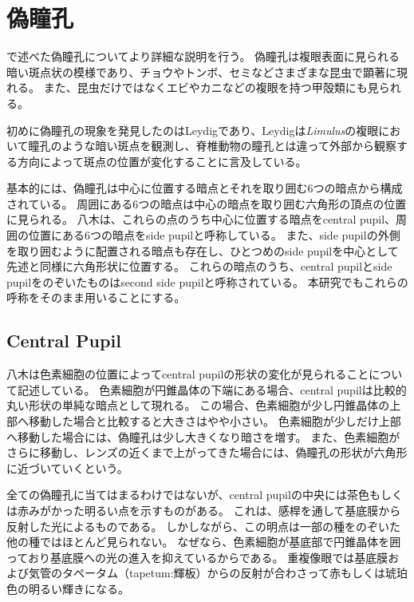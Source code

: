 \section{偽瞳孔}
\label{SPseudopupil}

で述べた偽瞳孔についてより詳細な説明を行う。
偽瞳孔は複眼表面に見られる暗い斑点状の模様であり、チョウやトンボ、セミなどさまざまな昆虫で顕著に現れる。
また、昆虫だけではなくエビやカニなどの複眼を持つ甲殻類にも見られる。


初めに偽瞳孔の現象を発見したのはLeydig\cite{}であり、Leydigは{\it Limulus}の複眼において瞳孔のような暗い斑点を観測し、脊椎動物の瞳孔とは違って外部から観察する方向によって斑点の位置が変化することに言及している。

基本的には、偽瞳孔は中心に位置する暗点とそれを取り囲む6つの暗点から構成されている。
周囲にある6つの暗点は中心の暗点を取り囲む六角形の頂点の位置に見られる。
八木\cite{}は、これらの点のうち中心に位置する暗点をcentral pupil、周囲の位置にある6つの暗点をside pupilと呼称している。
また、side pupilの外側を取り囲むように配置される暗点も存在し、ひとつめのside pupilを中心として先述と同様に六角形状に位置する。
これらの暗点のうち、central pupilとside pupilをのぞいたものはsecond side pupilと呼称されている。
本研究でもこれらの呼称をそのまま用いることにする。

\subsection{Central Pupil}
\label{SSCentralPupil}

八木は色素細胞の位置によってcentral pupilの形状の変化が見られることについて記述している。
色素細胞が円錐晶体の下端にある場合\figref{}、central pupilは比較的丸い形状の単純な暗点として現れる。
この場合、色素細胞が少し円錐晶体の上部へ移動した場合と比較すると大きさはやや小さい。
色素細胞が少しだけ上部へ移動した場合には、偽瞳孔は少し大きくなり暗さを増す。
また、色素細胞がさらに移動し、レンズの近くまで上がってきた場合には、偽瞳孔の形状が六角形に近づいていくという。

全ての偽瞳孔に当てはまるわけではないが、central pupilの中央には茶色もしくは赤みがかった明るい点を示すものがある。
これは、感桿を通して基底膜から反射した光によるものである。
しかしながら、この明点は一部の種をのぞいた他の種ではほとんど見られない。
なぜなら、色素細胞が基底部で円錐晶体を囲っており基底膜への光の進入を抑えているからである。
重複像眼では基底膜および気管のタペータム（tapetum:輝板）からの反射が合わさって赤もしくは琥珀色の明るい輝きになる。

